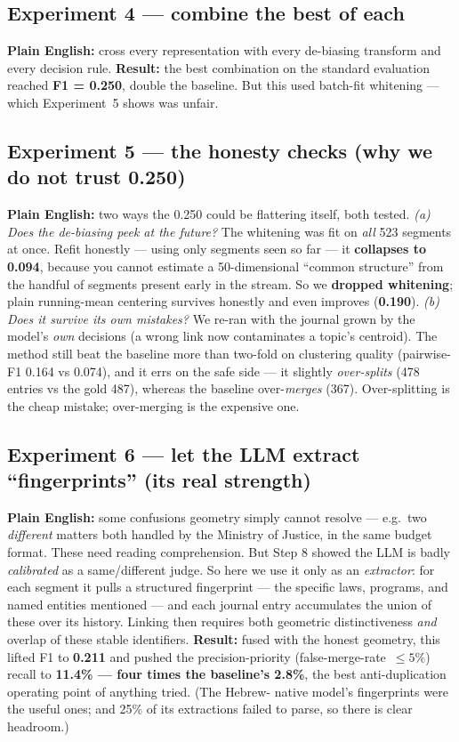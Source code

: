 \documentclass[11pt,a4paper]{article}
\begin{document}
\subsection{Experiment 4 --- combine the best of each}
\textbf{Plain English:} cross every representation with every de-biasing transform and every
decision rule. \textbf{Result:} the best combination on the standard evaluation reached
\textbf{F1 = 0.250}, double the baseline. But this used batch-fit whitening --- which
Experiment~5 shows was unfair.

\subsection{Experiment 5 --- the honesty checks (why we do not trust 0.250)}
\textbf{Plain English:} two ways the 0.250 could be flattering itself, both tested.
\emph{(a) Does the de-biasing peek at the future?} The whitening was fit on \emph{all} 523
segments at once. Refit honestly --- using only segments seen so far --- it \textbf{collapses
to 0.094}, because you cannot estimate a 50-dimensional ``common structure'' from the handful
of segments present early in the stream. So we \textbf{dropped whitening}; plain running-mean
centering survives honestly and even improves (\textbf{0.190}). \emph{(b) Does it survive its
own mistakes?} We re-ran with the journal grown by the model's \emph{own} decisions (a wrong
link now contaminates a topic's centroid). The method still beat the baseline more than
two-fold on clustering quality (pairwise-F1 0.164 vs 0.074), and it errs on the safe side ---
it slightly \emph{over-splits} (478 entries vs the gold 487), whereas the baseline
over-\emph{merges} (367). Over-splitting is the cheap mistake; over-merging is the expensive one.

\subsection{Experiment 6 --- let the LLM extract ``fingerprints'' (its real strength)}
\textbf{Plain English:} some confusions geometry simply cannot resolve --- e.g.\ two
\emph{different} matters both handled by the Ministry of Justice, in the same budget format.
These need reading comprehension. But Step 8 showed the LLM is badly \emph{calibrated} as a
same/different judge. So here we use it only as an \emph{extractor}: for each segment it pulls
a structured fingerprint --- the specific laws, programs, and named entities mentioned --- and
each journal entry accumulates the union of these over its history. Linking then requires
both geometric distinctiveness \emph{and} overlap of these stable identifiers. \textbf{Result:}
fused with the honest geometry, this lifted F1 to \textbf{0.211} and pushed the
precision-priority (false-merge-rate~$\le5\%$) recall to \textbf{11.4\% --- four times the
baseline's 2.8\%}, the best anti-duplication operating point of anything tried. (The Hebrew-
native model's fingerprints were the useful ones; and 25\% of its extractions failed to
parse, so there is clear headroom.)
\end{document}
